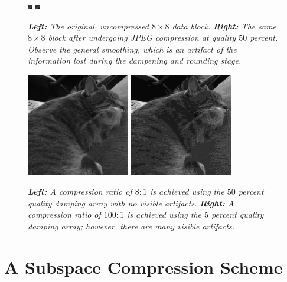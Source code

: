 \begin{figure}

	\centering
	\includegraphics[scale=20]{chap4/figures/charles_block.png}
	\includegraphics[scale=20]{chap4/figures/charles_block_reconstructed.png}
	\caption{{\em{\bf Left:} The original, uncompressed $8\times8$ data block.} {\em{\bf Right:} The same $8 \times 8$ block after undergoing JPEG compression at quality $50$ percent. Observe the general smoothing, which is an artifact of the information lost during the dampening and rounding stage.}}
\label{fig:blockrecon}
\end{figure}

\begin{figure}[H]
	\centering
	\includegraphics[width=0.4\textwidth]{chap4/figures/charles_gray_50.jpg}
	\includegraphics[width=0.4\textwidth]{chap4/figures/charles_gray_5.jpg}
	\caption{{\em{\bf Left:} A compression ratio of $8 : 1$ is achieved using the $50$ percent quality damping array with no visible artifacts.} {\em{\bf Right:} A compression ratio of $100 : 1$ is achieved using the $5$ percent quality damping array; however, there are many visible artifacts.}}
\label{fig:comp_comparison}
\end{figure}

\section{A Subspace Compression Scheme}
\label{sec:Algorithm}

